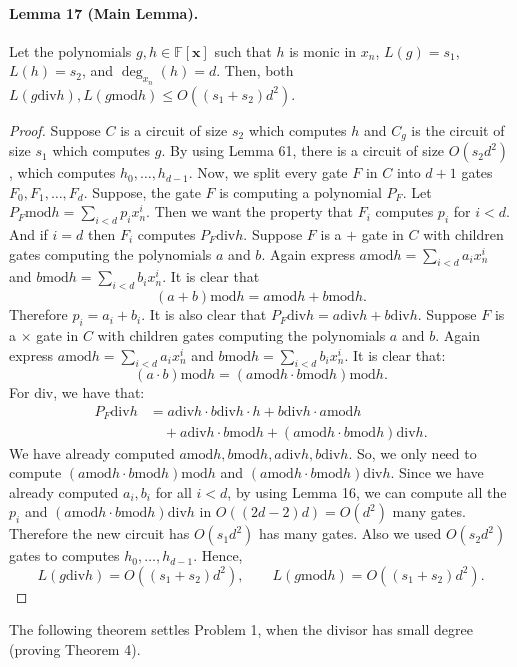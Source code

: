 \documentclass[10pt,a4paper]{article}
\begin{document}
\paragraph{Lemma 17 (Main Lemma).} Let the polynomials $g,h\in\mathbb F[\mathbf x]$ such that $h$ is monic in $x_n$, $L(g)=s_1$, $L(h)=s_2$, and $\deg_{x_n}(h)=d$. Then, both $L(g\mathbin{\mathrm{div}}h),L(g\mathbin{\mathrm{mod}}h)\le O((s_1+s_2)d^2)$.
\begin{proof}Suppose $C$ is a circuit of size $s_2$ which computes $h$ and $C_g$ is the circuit of size $s_1$ which computes $g$. By using Lemma 61, there is a circuit of size $O(s_2d^2)$, which computes $h_0,\ldots,h_{d-1}$. Now, we split every gate $F$ in $C$ into $d+1$ gates $F_0,F_1,\ldots,F_d$. Suppose, the gate $F$ is computing a polynomial $P_F$. Let $P_F\mathbin{\mathrm{mod}}h=\sum_{i<d}p_ix_n^i$. Then we want the property that $F_i$ computes $p_i$ for $i<d$. And if $i=d$ then $F_i$ computes $P_F\mathbin{\mathrm{div}}h$.
Suppose $F$ is a $+$ gate in $C$ with children gates computing the polynomials $a$ and $b$. Again express $a\mathbin{\mathrm{mod}}h=\sum_{i<d}a_ix_n^i$ and $b\mathbin{\mathrm{mod}}h=\sum_{i<d}b_ix_n^i$. It is clear that
\[(a+b)\mathbin{\mathrm{mod}}h=a\mathbin{\mathrm{mod}}h+b\mathbin{\mathrm{mod}}h.\]
Therefore $p_i=a_i+b_i$. It is also clear that $P_F\mathbin{\mathrm{div}}h=a\mathbin{\mathrm{div}}h+b\mathbin{\mathrm{div}}h$.
Suppose $F$ is a $\times$ gate in $C$ with children gates computing the polynomials $a$ and $b$. Again express $a\mathbin{\mathrm{mod}}h=\sum_{i<d}a_ix_n^i$ and $b\mathbin{\mathrm{mod}}h=\sum_{i<d}b_ix_n^i$. It is clear that:
\[(a\cdot b)\mathbin{\mathrm{mod}}h=(a\mathbin{\mathrm{mod}}h\cdot b\mathbin{\mathrm{mod}}h)\mathbin{\mathrm{mod}}h.\]
For $\mathrm{div}$, we have that:
\begin{align*}P_F\mathbin{\mathrm{div}}h&=a\mathbin{\mathrm{div}}h\cdot b\mathbin{\mathrm{div}}h\cdot h+b\mathbin{\mathrm{div}}h\cdot a\mathbin{\mathrm{mod}}h\\&\quad+a\mathbin{\mathrm{div}}h\cdot b\mathbin{\mathrm{mod}}h+(a\mathbin{\mathrm{mod}}h\cdot b\mathbin{\mathrm{mod}}h)\mathbin{\mathrm{div}}h.\end{align*}
We have already computed $a\mathbin{\mathrm{mod}}h,b\mathbin{\mathrm{mod}}h,a\mathbin{\mathrm{div}}h,b\mathbin{\mathrm{div}}h$. So, we only need to compute $(a\mathbin{\mathrm{mod}}h\cdot b\mathbin{\mathrm{mod}}h)\mathbin{\mathrm{mod}}h$ and $(a\mathbin{\mathrm{mod}}h\cdot b\mathbin{\mathrm{mod}}h)\mathbin{\mathrm{div}}h$. Since we have already computed $a_i,b_i$ for all $i<d$, by using Lemma 16, we can compute all the $p_i$ and $(a\mathbin{\mathrm{mod}}h\cdot b\mathbin{\mathrm{mod}}h)\mathbin{\mathrm{div}}h$ in $O((2d-2)d)=O(d^2)$ many gates. Therefore the new circuit has $O(s_1d^2)$ has many gates. Also we used $O(s_2d^2)$ gates to computes $h_0,\ldots,h_{d-1}$. Hence,
\[L(g\mathbin{\mathrm{div}}h)=O((s_1+s_2)d^2),\qquad L(g\mathbin{\mathrm{mod}}h)=O((s_1+s_2)d^2).\]\end{proof}
The following theorem settles Problem 1, when the divisor has small degree (proving Theorem 4).
\end{document}
